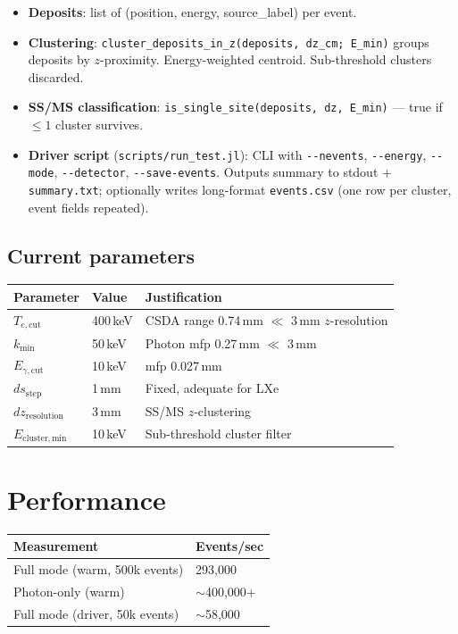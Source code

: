 \documentclass{article}
\begin{document}
\begin{itemize}
  \item \textbf{Deposits}: list of (position, energy, source\_label) per event.
  \item \textbf{Clustering}: \texttt{cluster\_deposits\_in\_z(deposits, dz\_cm; E\_min)} groups deposits by $z$-proximity. Energy-weighted centroid. Sub-threshold clusters discarded.
  \item \textbf{SS/MS classification}: \texttt{is\_single\_site(deposits, dz, E\_min)} --- true if $\leq 1$ cluster survives.
  \item \textbf{Driver script} (\texttt{scripts/run\_test.jl}): CLI with \texttt{-{}-nevents}, \texttt{-{}-energy}, \texttt{-{}-mode}, \texttt{-{}-detector}, \texttt{-{}-save-events}. Outputs summary to stdout + \texttt{summary.txt}; optionally writes long-format \texttt{events.csv} (one row per cluster, event fields repeated).
\end{itemize}

\subsection{Current parameters}

\begin{table}[h]
\centering
\begin{tabular}{@{}lll@{}}
\toprule
Parameter & Value & Justification \\
\midrule
$T_{e,\mathrm{cut}}$   & 400\,keV & CSDA range 0.74\,mm $\ll$ 3\,mm $z$-resolution \\
$k_{\min}$              & 50\,keV  & Photon mfp 0.27\,mm $\ll$ 3\,mm \\
$E_{\gamma,\mathrm{cut}}$ & 10\,keV  & mfp 0.027\,mm \\
$ds_{\mathrm{step}}$    & 1\,mm    & Fixed, adequate for LXe \\
$dz_{\mathrm{resolution}}$ & 3\,mm    & SS/MS $z$-clustering \\
$E_{\mathrm{cluster,min}}$ & 10\,keV  & Sub-threshold cluster filter \\
\bottomrule
\end{tabular}
\end{table}

\section{Performance}

\begin{table}[h]
\centering
\begin{tabular}{@{}ll@{}}
\toprule
Measurement & Events/sec \\
\midrule
Full mode (warm, 500k events)  & 293,000 \\
Photon-only (warm)             & $\sim$400,000+ \\
Full mode (driver, 50k events) & $\sim$58,000 \\
\bottomrule
\end{tabular}
\end{table}
\end{document}
